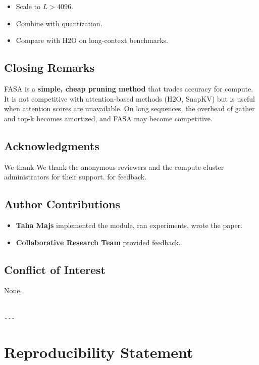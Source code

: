 \begin{itemize}
\item Scale to $L > 4096$.
\item Combine with quantization.
\item Compare with H2O on long-context benchmarks.

\end{itemize}
\subsection{Closing Remarks}

FASA is a \textbf{simple, cheap pruning method} that trades accuracy for 
compute. It is not competitive with attention-based methods (H2O, SnapKV) 
but is useful when attention scores are unavailable. On long sequences, 
the overhead of gather and top-k becomes amortized, and FASA may become 
competitive.

\subsection{Acknowledgments}

We thank We thank the anonymous reviewers and the compute cluster administrators for their support. for feedback.

\subsection{Author Contributions}

\begin{itemize}
\item \textbf{Taha Majs} implemented the module, ran experiments, wrote the paper.
\item \textbf{Collaborative Research Team} provided feedback.

\end{itemize}
\subsection{Conflict of Interest}

None.
\begin{lstlisting}

---
\end{lstlisting}


\section{Reproducibility Statement}

